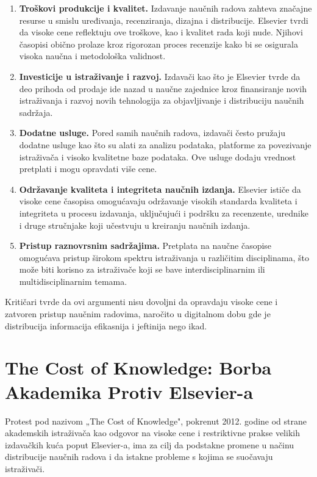 \documentclass{article}
\begin{document}
\begin{enumerate}
    \item \textbf{Troškovi produkcije i kvalitet.} Izdavanje naučnih radova zahteva značajne resurse u smislu uređivanja, recenziranja, dizajna i distribucije. Elsevier tvrdi da visoke cene reflektuju ove troškove, kao i kvalitet rada koji nude. Njihovi časopisi obično prolaze kroz rigorozan proces recenzije kako bi se osigurala visoka naučna i metodološka validnost.
    \item \textbf{Investicije u istraživanje i razvoj.} Izdavači kao što je Elsevier tvrde da deo prihoda od prodaje ide nazad u naučne zajednice kroz finansiranje novih istraživanja i razvoj novih tehnologija za objavljivanje i distribuciju naučnih sadržaja.
    \item \textbf{Dodatne usluge.} Pored samih naučnih radova, izdavači često pružaju dodatne usluge kao što su alati za analizu podataka, platforme za povezivanje istraživača i visoko kvalitetne baze podataka. Ove usluge dodaju vrednost pretplati i mogu opravdati više cene.
    \item \textbf{Održavanje kvaliteta i integriteta naučnih izdanja.} Elsevier ističe da visoke cene časopisa omogućavaju održavanje visokih standarda kvaliteta i integriteta u procesu izdavanja, uključujući i podršku za recenzente, urednike i druge stručnjake koji učestvuju u kreiranju naučnih izdanja.
    \item \textbf{Pristup raznovrsnim sadržajima.} Pretplata na naučne časopise omogućava pristup širokom spektru istraživanja u različitim disciplinama, što može biti korisno za istraživače koji se bave interdisciplinarnim ili multidisciplinarnim temama.
\end{enumerate}

Kritičari tvrde da ovi argumenti nisu dovoljni da opravdaju visoke cene i zatvoren pristup naučnim radovima, naročito u digitalnom dobu gde je distribucija informacija efikasnija i jeftinija nego ikad.


\section{The Cost of Knowledge: Borba Akademika Protiv Elsevier-a}

Protest pod nazivom „The Cost of Knowledge", pokrenut 2012. godine od strane akademskih istraživača kao odgovor na visoke cene i restriktivne prakse velikih izdavačkih kuća poput Elsevier-a, ima za cilj da podstakne promene u načinu distribucije naučnih radova i da istakne probleme s kojima se suočavaju istraživači.
\end{document}
